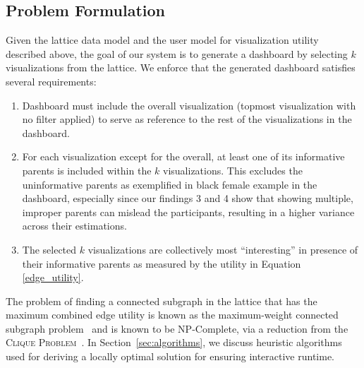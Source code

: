 \subsection{Problem Formulation}
Given the lattice data model and the user model for visualization utility described above, the goal of our system is to generate a dashboard by selecting $k$ visualizations from the lattice. We enforce that the generated dashboard satisfies several requirements:
 \begin{enumerate}
 	\item Dashboard must include the overall visualization (topmost visualization with no filter applied) to serve as reference to the rest of the visualizations in the dashboard.
 	\item For each visualization except for the overall, at least one of its informative parents is included within the $k$ visualizations. This excludes the uninformative parents as exemplified in black female example in the dashboard, especially since our findings 3 and 4 show that showing multiple, improper parents can mislead the participants, resulting in a higher variance across their estimations. %
 	\item The selected $k$ visualizations are collectively most ``interesting'' in presence of their informative parents as measured by the utility in Equation \ref{edge_utility}.
\end{enumerate}
 The problem of finding a connected subgraph in the lattice that has the maximum combined edge utility is  known as the maximum-weight connected subgraph problem~\cite{ErnstAlthaus2009} and is known to be NP-Complete, via a reduction from the \textsc{Clique Problem}~\cite{Parameswaran2010}. In Section~\ref{sec:algorithms}, we discuss heuristic algorithms used for deriving a locally optimal solution for ensuring interactive runtime.
